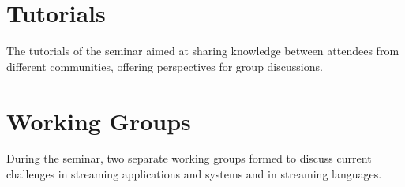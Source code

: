 \documentclass[preprint]{sig-alternate-10pt}
\begin{document}

\section{Tutorials}
The tutorials of the seminar aimed at sharing knowledge between
attendees from different communities, offering perspectives for group
discussions.




\section{Working Groups}
During the seminar, two separate working groups formed to discuss
current challenges in streaming applications and systems and in
streaming languages.






\balance

\end{document}
